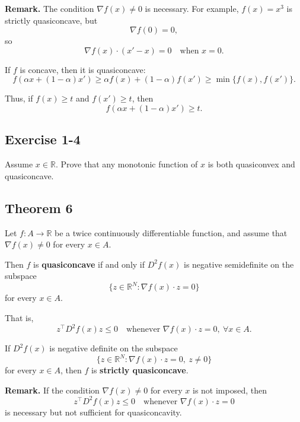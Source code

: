\textbf{Remark.} The condition $\nabla f(x) \ne 0$ is necessary.  
For example, $f(x) = x^3$ is strictly quasiconcave, but
\[
\nabla f(0) = 0,
\]
so
\[
\nabla f(x)\cdot (x' - x) = 0 \quad \text{when } x=0.
\]

\vspace{1em}

If $f$ is concave, then it is quasiconcave:
\[
f(\alpha x + (1-\alpha)x')
\ge \alpha f(x) + (1-\alpha)f(x')
\ge \min\{f(x), f(x')\}.
\]

Thus, if $f(x) \ge t$ and $f(x') \ge t$, then
\[
f(\alpha x + (1-\alpha)x') \ge t.
\]

\begin{tcolorbox}[breakable]

\subsection*{Exercise 1-4}

Assume $x \in \mathbb{R}$. Prove that any monotonic function of $x$
is both quasiconvex and quasiconcave.


\end{tcolorbox}


\begin{tcolorbox}[breakable, colback=white]

\subsection*{Theorem 6}

Let $f : A \to \mathbb{R}$ be a twice continuously differentiable function,
and assume that $\nabla f(x) \ne 0$ for every $x \in A$.

Then $f$ is \textbf{quasiconcave} if and only if $D^2 f(x)$ is negative semidefinite
on the subspace
\[
\{ z \in \mathbb{R}^N : \nabla f(x)\cdot z = 0 \}
\]
for every $x \in A$.

That is,
\[
z^\top D^2 f(x) z \le 0
\quad \text{whenever } \nabla f(x)\cdot z = 0, \ \forall x \in A.
\]

If $D^2 f(x)$ is negative definite on the subspace
\[
\{ z \in \mathbb{R}^N : \nabla f(x)\cdot z = 0,\ z \ne 0 \}
\]
for every $x \in A$, then $f$ is \textbf{strictly quasiconcave}.

\end{tcolorbox}


\vspace{1em}

\textbf{Remark.} If the condition $\nabla f(x) \ne 0$ for every $x$ is not imposed,
then
\[
z^\top D^2 f(x) z \le 0 \quad \text{whenever } \nabla f(x)\cdot z = 0
\]
is necessary but not sufficient for quasiconcavity.

